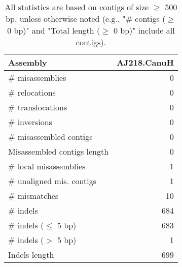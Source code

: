 \documentclass[12pt,a4paper]{article}
\begin{document}
\begin{table}[ht]
\begin{center}
\caption{All statistics are based on contigs of size $\geq$ 500 bp, unless otherwise noted (e.g., "\# contigs ($\geq$ 0 bp)" and "Total length ($\geq$ 0 bp)" include all contigs).}
\begin{tabular}{|l*{1}{|r}|}
\hline
Assembly & AJ218.CanuH \\ \hline
\# misassemblies & 0 \\ \hline
\hspace{5mm}\# relocations & 0 \\ \hline
\hspace{5mm}\# translocations & 0 \\ \hline
\hspace{5mm}\# inversions & 0 \\ \hline
\# misassembled contigs & 0 \\ \hline
Misassembled contigs length & 0 \\ \hline
\# local misassemblies & 1 \\ \hline
\# unaligned mis. contigs & 1 \\ \hline
\# mismatches & 10 \\ \hline
\# indels & 684 \\ \hline
\hspace{5mm}\# indels ($\leq$ 5 bp) & 683 \\ \hline
\hspace{5mm}\# indels ($>$ 5 bp) & 1 \\ \hline
Indels length & 699 \\ \hline
\end{tabular}
\end{center}
\end{table}
\end{document}
